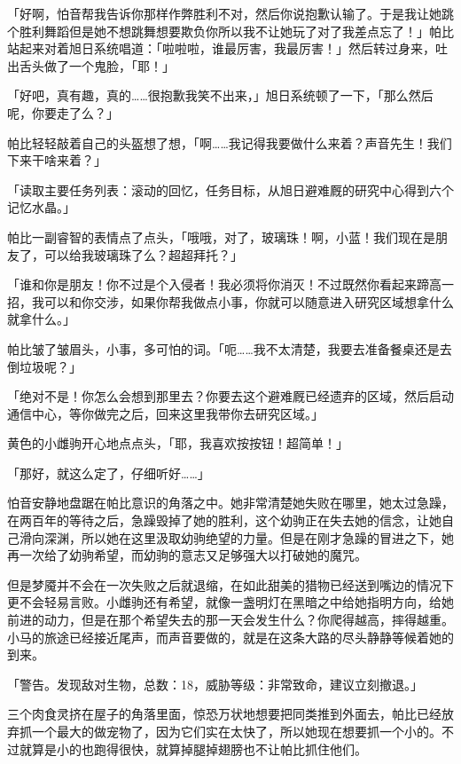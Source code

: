 「好啊，怕音帮我告诉你那样作弊胜利不对，然后你说抱歉认输了。于是我让她跳个胜利舞蹈但是她不想跳舞想要欺负你所以我不让她玩了对了我差点忘了！」帕比站起来对着旭日系统唱道：「啦啦啦，谁最厉害，我最厉害！」然后转过身来，吐出舌头做了一个鬼脸，「耶！」

「好吧，真有趣，真的……很抱歉我笑不出来，」旭日系统顿了一下，「那么然后呢，你要走了么？」

帕比轻轻敲着自己的头盔想了想，「啊……我记得我要做什么来着？声音先生！我们下来干啥来着？」

「{\mt 读取主要任务列表：滚动的回忆，任务目标，从旭日避难厩的研究中心得到六个记忆水晶。}」

帕比一副睿智的表情点了点头，「哦哦，对了，玻璃珠！啊，小蓝！我们现在是朋友了，可以给我玻璃珠了么？超超拜托？」

「谁和你是朋友！你不过是个入侵者！我必须将你消灭！不过既然你看起来蹄高一招，我可以和你交涉，如果你帮我做点小事，你就可以随意进入研究区域想拿什么就拿什么。」

帕比皱了皱眉头，小事，多可怕的词。「呃……我不太清楚，我要去准备餐桌还是去倒垃圾呢？」

「绝对不是！你怎么会想到那里去？你要去这个避难厩已经遗弃的区域，然后启动通信中心，等你做完之后，回来这里我带你去研究区域。」

黄色的小雌驹开心地点点头，「耶，我喜欢按按钮！超简单！」

「那好，就这么定了，仔细听好……」

\horizonline

\unknowndaytimeplace

怕音安静地盘踞在帕比意识的角落之中。她非常清楚她失败在哪里，她太过急躁，在两百年的等待之后，急躁毁掉了她的胜利，这个幼驹正在失去她的信念，让她自己滑向深渊，所以她在这里汲取幼驹绝望的力量。但是在刚才急躁的冒进之下，她再一次给了幼驹希望，而幼驹的意志又足够强大以打破她的魔咒。

但是梦魇并不会在一次失败之后就退缩，在如此甜美的猎物已经送到嘴边的情况下更不会轻易言败。小雌驹还有希望，就像一盏明灯在黑暗之中给她指明方向，给她前进的动力，但是在那个希望失去的那一天会发生什么？你爬得越高，摔得越重。小马的旅途已经接近尾声，而声音要做的，就是在这条大路的尽头静静等候着她的到来。

\horizonline


「{\mt 警告。发现敌对生物，总数：18，威胁等级：非常致命，建议立刻撤退。}」

三个肉食灵挤在屋子的角落里面，惊恐万状地想要把同类推到外面去，帕比已经放弃抓一个最大的做宠物了，因为它们实在太快了，所以她现在想要抓一个小的。不过就算是小的也跑得很快，就算掉腿掉翅膀也不让帕比抓住他们。

